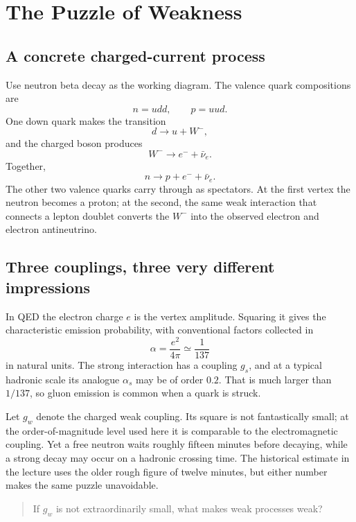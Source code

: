 \section{The Puzzle of Weakness}

\subsection{A concrete charged-current process}

Use neutron beta decay as the working diagram. The valence quark
compositions are
\begin{equation}
  n=udd,\qquad p=uud.
\end{equation}
One down quark makes the transition
\begin{equation}
  d\longrightarrow u+W^-,
\end{equation}
and the charged boson produces
\begin{equation}
  W^-\longrightarrow e^-+\bar\nu_e.
\end{equation}
Together,
\begin{equation}
  n\longrightarrow p+e^-+\bar\nu_e.
\end{equation}
The other two valence quarks carry through as spectators. At the first vertex
the neutron becomes a proton; at the second, the same weak interaction that
connects a lepton doublet converts the \(W^-\) into the observed electron and
electron antineutrino.

\subsection{Three couplings, three very different impressions}

In QED the electron charge \(e\) is the vertex amplitude. Squaring it gives
the characteristic emission probability, with conventional factors collected
in
\begin{equation}
  \alpha=\frac{e^2}{4\pi}\simeq\frac1{137}
\end{equation}
in natural units. The strong interaction has a coupling \(g_s\), and at a
typical hadronic scale its analogue \(\alpha_s\) may be of order \(0.2\).
That is much larger than \(1/137\), so gluon emission is common when a quark
is struck.

Let \(g_w\) denote the charged weak coupling. Its square is not fantastically
small; at the order-of-magnitude level used here it is comparable to the
electromagnetic coupling. Yet a free neutron waits roughly fifteen minutes
before decaying, while a strong decay may occur on a hadronic crossing time.
The historical estimate in the lecture uses the older rough figure of twelve
minutes, but either number makes the same puzzle unavoidable.
\begin{quote}
If \(g_w\) is not extraordinarily small, what makes weak processes weak?
\end{quote}

